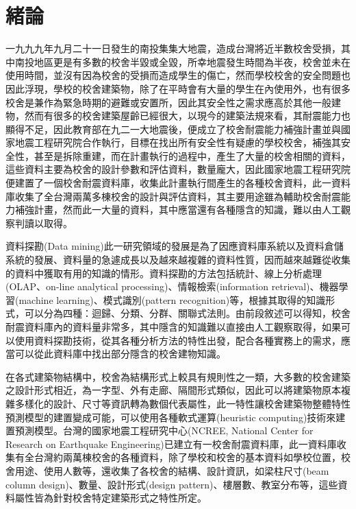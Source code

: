 % 
\chapter{緒論}
\label{cha:intro} 

一九九九年九月二十一日發生的南投集集大地震，造成台灣將近半數校舍受損，其中南投地區更是有多數的校舍半毀或全毀，所幸地震發生時間為半夜，校舍並未在使用時間，並沒有因為校舍的受損而造成學生的傷亡，然而學校校舍的安全問題也因此浮現，學校的校舍建築物，除了在平時會有大量的學生在內使用外，也有很多校舍是兼作為緊急時期的避難或安置所，因此其安全性之需求應高於其他一般建物，然而有很多的校舍建築屋齡已經很大，以現今的建築法規來看，其耐震能力也顯得不足，因此教育部在九二一大地震後，便成立了校舍耐震能力補強計畫並與國家地震工程研究院合作執行，目標在找出所有安全性有疑慮的學校校舍，補強其安全性，甚至是拆除重建，而在計畫執行的過程中，產生了大量的校舍相關的資料，這些資料主要為校舍的設計參數和評估資料，數量龐大，因此國家地震工程研究院便建置了一個校舍耐震資料庫，收集此計畫執行間產生的各種校舍資料，此一資料庫收集了全台灣兩萬多棟校舍的設計與評估資料，其主要用途雖為輔助校舍耐震能力補強計畫，然而此一大量的資料，其中應當還有各種隱含的知識，難以由人工觀察判讀以取得。

資料探勘(Data mining)此一研究領域的發展是為了因應資料庫系統以及資料倉儲系統的發展、資料量的急遽成長以及越來越複雜的資料性質，因而越來越難從收集的資料中獲取有用的知識的情形。資料探勘的方法包括統計、線上分析處理(OLAP、on-line analytical processing)、情報檢索(information retrieval)、機器學習(machine learning)、模式識別(pattern recognition)等，根據其取得的知識形式，可以分為四種：迴歸、分類、分群、關聯式法則。由前段敘述可以得知，校舍耐震資料庫內的資料量非常多，其中隱含的知識難以直接由人工觀察取得，如果可以使用資料探勘技術，從其各種分析方法的特性出發，配合各種實務上的需求，應當可以從此資料庫中找出部分隱含的校舍建物知識。

在各式建築物結構中，校舍為結構形式上較具有規則性之一類，大多數的校舍建築之設計形式相近，為一字型、外有走廊、隔間形式類似，因此可以將建築物原本複雜多樣化的設計、尺寸等資訊轉為數個代表屬性，此一特性讓校舍建築物整體特性預測模型的建置變成可能，可以使用各種軟式運算(heuristic computing)技術來建置預測模型。台灣的國家地震工程研究中心(NCREE, National Center for Research on Earthquake Engineering)已建立有一校舍耐震資料庫，此一資料庫收集有全台灣約兩萬棟校舍的各種資料，除了學校和校舍的基本資料如學校位置，校舍用途、使用人數等，還收集了各校舍的結構、設計資訊，如梁柱尺寸(beam column design)、數量、設計形式(design pattern)、樓層數、教室分布等，這些資料屬性皆為針對校舍特定建築形式之特性所定。

